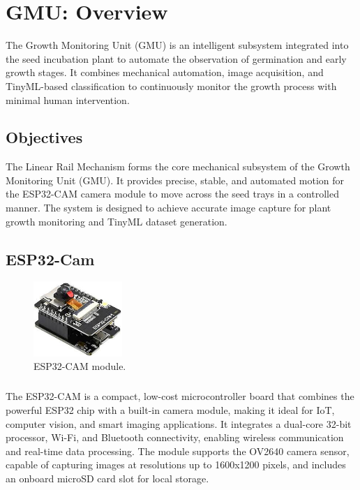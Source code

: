 \documentclass[../main]{subfiles}
\begin{document}
\chapter{GMU: Overview}

The Growth Monitoring Unit (GMU) is an intelligent subsystem integrated into the seed incubation plant to automate the observation of germination and early growth stages. It combines mechanical automation, image acquisition, and TinyML-based classification to continuously monitor the growth process with minimal human intervention.

\section{Objectives}
The Linear Rail Mechanism forms the core mechanical subsystem of the Growth Monitoring Unit (GMU). It provides precise, stable, and automated motion for the ESP32-CAM camera module to move across the seed trays in a controlled manner. The system is designed to achieve accurate image capture for plant growth monitoring and TinyML dataset generation.
\section{ESP32-Cam}
\begin{figure}[H] %
    \centering
    \includegraphics[width=0.3\textwidth]{pics/download.jpg} %
    \caption{ESP32-CAM module.}
    \label{fig:esp32cam}
\end{figure}
\paragraph{}
The ESP32-CAM is a compact, low-cost microcontroller board that combines the powerful ESP32 chip with a built-in camera module, making it ideal for IoT, computer vision, and smart imaging applications. It integrates a dual-core 32-bit processor, Wi-Fi, and Bluetooth connectivity, enabling wireless communication and real-time data processing. The module supports the OV2640 camera sensor, capable of capturing images at resolutions up to 1600x1200 pixels, and includes an onboard microSD card slot for local storage.
\end{document}
